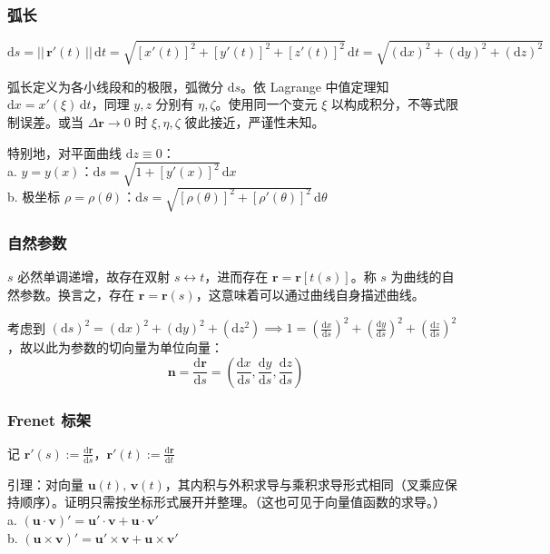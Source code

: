 \documentclass[12pt, a4paper, UTF8, openany]{ctexbook}
\newcommand{\dif}{\mathrm{d}}
\newcommand{\difx}{\,\mathrm{d}x}
\newcommand{\mat}[1]{\mathbf{#1}}
\newcommand{\len}[1]{||\, #1 \,||}%
\begin{document}
        \subsubsection{弧长}
        $$\dif s = \len{\mat{r}'(t)} \,\dif t = \sqrt{[x'(t)]^2 + [y'(t)]^2 + [z'(t)]^2} \,\dif t = \sqrt{(\dif x)^2 + (\dif y)^2 + (\dif z)^2}$$

        弧长定义为各小线段和的极限，弧微分 $\dif s$。依 Lagrange 中值定理知 $\dif x = x'(\xi)\,\dif t$，同理 $y, z$ 分别有 $\eta, \zeta$。使用同一个变元 $\xi$ 以构成积分，不等式限制误差。或当 $\Delta\mat{r} \to 0$ 时 $\xi, \eta, \zeta$ 彼此接近，严谨性未知。

        {\heiti 特别地}，对平面曲线 $\dif z \equiv 0$：\\
        a. $y = y(x)$：$\dif s = \sqrt{1 + [y'(x)]^2} \difx$ \\
        b. 极坐标 $\rho = \rho(\theta)$：$\dif s = \sqrt{[\rho(\theta)]^2 + [\rho'(\theta)]^2} \,\dif\theta$

        \subsubsection{自然参数}
        $s$ 必然单调递增，故存在双射 $s \leftrightarrow t$，进而存在 $\mat{r} = \mat{r}[t(s)]$。称 $s$ 为曲线的自然参数。换言之，存在 $\mat{r} = \mat{r}(s)$，这意味着可以通过曲线自身描述曲线。

        考虑到 $(\dif s)^2 = (\dif x)^2 + (\dif y)^2 + (\dif z^2) \implies 1 = (\frac{\dif x}{\dif s})^2 + (\frac{\dif y}{\dif s})^2 + (\frac{\dif z}{\dif s})^2$，故以此为参数的切向量为{\heiti 单位向量}：
        $$\mat{n} = \frac{\dif \mat{r}}{\dif s} = (\frac{\dif x}{\dif s}, \frac{\dif y}{\dif s}, \frac{\dif z}{\dif s})$$

        \subsubsection{Frenet 标架}
        记 $\mat{r}'(s) := \frac{\dif \mat{r}}{\dif s}$，$\mat{r}'(t) := \frac{\dif \mat{r}}{\dif t}$

        {\heiti 引理}：对向量 $\mat{u}(t), \, \mat{v}(t)$，其内积与外积求导与乘积求导形式相同（{\heiti 叉乘应保持顺序}）。证明只需按坐标形式展开并整理。（这也可见于向量值函数的求导。）\\
        a. $(\mat{u} \cdot \mat{v})' = \mat{u}' \cdot \mat{v} + \mat{u} \cdot \mat{v}'$ \\
        b. $(\mat{u} \times \mat{v})' = \mat{u}' \times \mat{v} + \mat{u} \times \mat{v}'$
\end{document}
